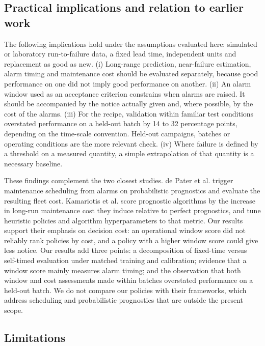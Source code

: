 \documentclass[a4paper,fleqn,doubleblind]{cas-dc}
\begin{document}
\subsection{Practical implications and relation to earlier work}

The following implications hold under the assumptions evaluated here: simulated or laboratory run-to-failure data, a fixed lead time, independent units and replacement as good as new. (i) Long-range prediction, near-failure estimation, alarm timing and maintenance cost should be evaluated separately, because good performance on one did not imply good performance on another. (ii) An alarm window used as an acceptance criterion constrains when alarms are raised. It should be accompanied by the notice actually given and, where possible, by the cost of the alarms. (iii) For the recipe, validation within familiar test conditions overstated performance on a held-out batch by 14 to 32 percentage points, depending on the time-scale convention. Held-out campaigns, batches or operating conditions are the more relevant check. (iv) Where failure is defined by a threshold on a measured quantity, a simple extrapolation of that quantity is a necessary baseline.

These findings complement the two closest studies. de Pater et al. \cite{depater2022} trigger maintenance scheduling from alarms on probabilistic prognostics and evaluate the resulting fleet cost. Kamariotis et al. \cite{kamariotis2024} score prognostic algorithms by the increase in long-run maintenance cost they induce relative to perfect prognostics, and tune heuristic policies and algorithm hyperparameters to that metric. Our results support their emphasis on decision cost: an operational window score did not reliably rank policies by cost, and a policy with a higher window score could give less notice. Our results add three points: a decomposition of fixed-time versus self-timed evaluation under matched training and calibration; evidence that a window score mainly measures alarm timing; and the observation that both window and cost assessments made within batches overstated performance on a held-out batch. We do not compare our policies with their frameworks, which address scheduling and probabilistic prognostics that are outside the present scope.

\subsection{Limitations}
\end{document}
